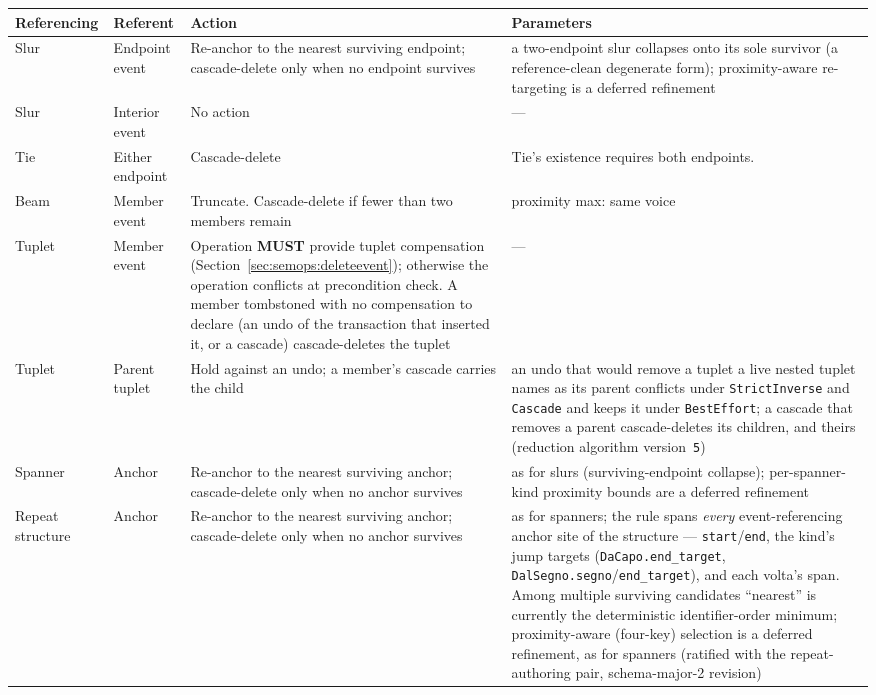 \documentclass[11pt,letterpaper]{report}
\newcommand{\MUST}{\textbf{MUST}}
\begin{document}
\begin{longtable}{p{3.0cm} p{2.6cm} p{2.4cm} p{4.4cm}}
  \toprule
  \textbf{Referencing} & \textbf{Referent} & \textbf{Action} &
  \textbf{Parameters} \\
  \midrule
  \endhead

  Slur & Endpoint event &
  Re-anchor to the nearest surviving endpoint; cascade-delete only
  when no endpoint survives &
  a two-endpoint slur collapses onto its sole survivor (a
  reference-clean degenerate form); proximity-aware re-targeting
  is a deferred refinement \\

  Slur & Interior event &
  No action &
  --- \\

  Tie & Either endpoint &
  Cascade-delete &
  Tie's existence requires both endpoints. \\

  Beam & Member event &
  Truncate. Cascade-delete if fewer than two members remain &
  proximity max: same voice \\

  Tuplet & Member event &
  Operation \MUST{} provide tuplet compensation
  (Section~\ref{sec:semops:deleteevent}); otherwise the operation
  conflicts at precondition check. A member tombstoned with no
  compensation to declare (an undo of the transaction that inserted it,
  or a cascade) cascade-deletes the tuplet &
  --- \\

  Tuplet & Parent tuplet &
  Hold against an undo; a member's cascade carries the child &
  an undo that would remove a tuplet a live nested tuplet names as its
  parent conflicts under \texttt{StrictInverse} and \texttt{Cascade} and
  keeps it under \texttt{BestEffort}; a cascade that removes a parent
  cascade-deletes its children, and theirs (reduction algorithm
  version~\texttt{5}) \\

  Spanner & Anchor &
  Re-anchor to the nearest surviving anchor; cascade-delete only
  when no anchor survives &
  as for slurs (surviving-endpoint collapse); per-spanner-kind
  proximity bounds are a deferred refinement \\

  Repeat structure & Anchor &
  Re-anchor to the nearest surviving anchor; cascade-delete only
  when no anchor survives &
  as for spanners; the rule spans \emph{every} event-referencing
  anchor site of the structure --- \texttt{start}/\texttt{end},
  the kind's jump targets (\texttt{DaCapo.end\_target},
  \texttt{DalSegno.segno}/\texttt{end\_target}), and each
  volta's span. Among multiple surviving candidates ``nearest''
  is currently the deterministic identifier-order minimum;
  proximity-aware (four-key) selection is a deferred refinement,
  as for spanners (ratified with the repeat-authoring pair,
  schema-major-2 revision) \\


\end{longtable}
\end{document}
